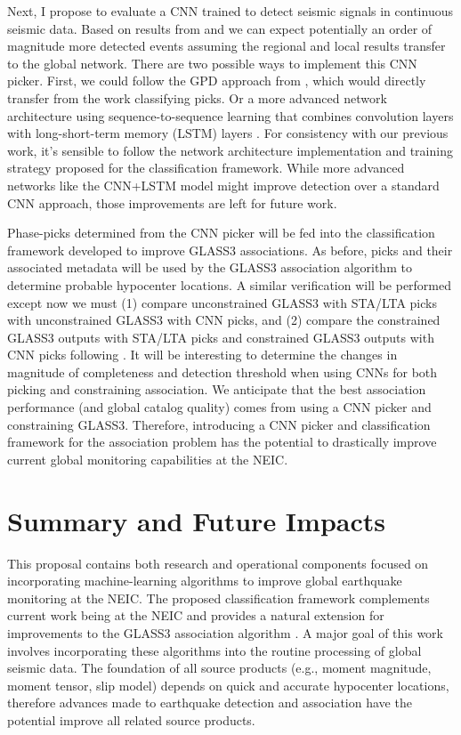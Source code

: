\documentclass[12p]{article}
\begin{document}
Next, I propose to evaluate a CNN trained to detect seismic signals in continuous seismic data. Based on results from \citet{Perol2018} and \citet{Ross2018b} we can expect potentially an order of magnitude more detected events assuming the regional and local results transfer to the global network. There are two possible ways to implement this CNN picker. First, we could follow the GPD approach from \citet{Ross2018b}, which would directly transfer from the work classifying picks. Or a more advanced network architecture using sequence-to-sequence learning that combines convolution layers with long-short-term memory (LSTM) layers \citep{Mousavi2019}. For consistency with our previous work, it's sensible to follow the network architecture implementation and training strategy proposed for the classification framework. While more advanced networks like the CNN+LSTM model might improve detection over a standard CNN approach, those improvements are left for future work.

Phase-picks determined from the CNN picker will be fed into the classification framework developed to improve GLASS3 associations. As before, picks and their associated metadata will be used by the GLASS3 association algorithm to determine probable hypocenter locations. A similar verification will be performed except now we must (1) compare unconstrained GLASS3 with STA/LTA picks with unconstrained GLASS3 with CNN picks, and (2) compare the constrained GLASS3 outputs with STA/LTA picks and constrained GLASS3 outputs with CNN picks following \citet{Yeck2019}. It will be interesting to determine the changes in magnitude of completeness and detection threshold when using CNNs for both picking and constraining association. We anticipate that the best association performance (and global catalog quality) comes from using a CNN picker and constraining GLASS3. Therefore, introducing a CNN picker and classification framework for the association problem has the potential to drastically improve current global monitoring capabilities at the NEIC.

\section*{Summary and Future Impacts}
This proposal contains both research and operational components focused on incorporating machine-learning algorithms to improve global earthquake monitoring at the NEIC. The proposed classification framework complements current work being  at the NEIC and provides a natural extension for improvements to the GLASS3 association algorithm \citep{Yeck2019}. A major goal of this work involves incorporating these algorithms into the routine processing of global seismic data. The foundation of all source products (e.g., moment magnitude, moment tensor, slip model) depends on quick and accurate hypocenter locations, therefore advances made to earthquake detection and association have the potential improve all related source products.
\end{document}
